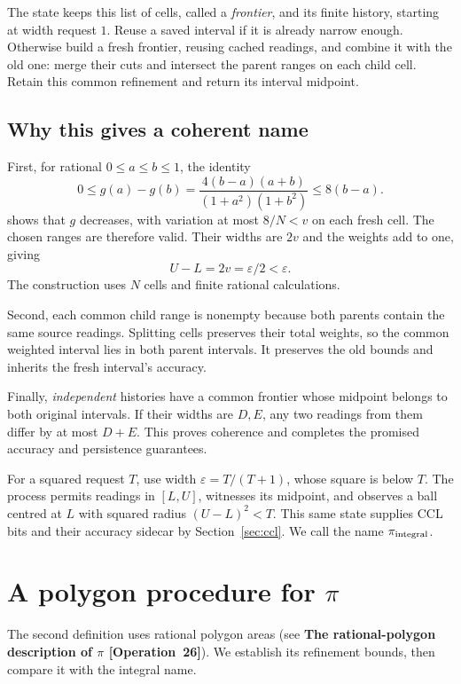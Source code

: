 \documentclass[11pt]{article}
\newcommand{\entryname}[3]{\textbf{#3 \mbox{[#1~#2]}}}
\begin{document}
The state keeps this list of cells, called a \emph{frontier}, and its
finite history, starting at width request $1$. Reuse a saved interval if
it is already narrow enough. Otherwise build a fresh frontier, reusing
cached readings, and combine it with the old one: merge their cuts and
intersect the parent ranges on each child cell. Retain this common
refinement and return its interval midpoint.

\subsection*{Why this gives a coherent name}

First, for rational $0\leq a\leq b\leq1$, the identity
\[
 0\leq g(a)-g(b)
   =\frac{4(b-a)(a+b)}{(1+a^2)(1+b^2)}\leq8(b-a).
\]
shows that $g$ decreases, with variation at most $8/N<v$ on each fresh
cell. The chosen ranges are therefore valid. Their widths are $2v$ and
the weights add to one, giving
\[
                          U-L=2v=\varepsilon/2<\varepsilon.
\]
The construction uses $N$ cells and finite rational calculations.

Second, each common child range is nonempty because both parents contain
the same source readings. Splitting cells preserves their total weights,
so the common weighted interval lies in both parent intervals. It preserves
the old bounds and inherits the fresh interval's accuracy.

Finally, \emph{independent} histories have a common frontier whose midpoint
belongs to both original intervals. If their widths are $D,E$, any two
readings from them differ by at most $D+E$. This proves coherence and
completes the promised accuracy and persistence guarantees.

For a squared request $T$, use width $\varepsilon=T/(T+1)$, whose square
is below $T$. The process permits readings in $[L,U]$, witnesses its
midpoint, and observes a ball centred at $L$ with squared radius
$(U-L)^2<T$. This same state supplies CCL bits and their accuracy sidecar
by Section~\ref{sec:ccl}. We call the name $\pi_{\rm integral}$.

\section{A polygon procedure for \texorpdfstring{$\pi$}{pi}}\label{sec:polygon}

The second definition uses rational polygon areas
(see \entryname{Operation}{26}{The rational-polygon description of $\pi$}). We establish its
refinement bounds, then compare it with the integral name.
\end{document}
